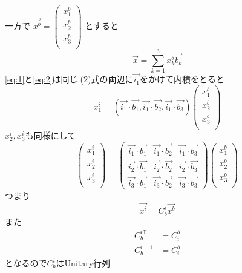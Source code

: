 \documentclass[class=article, crop=false, preview=false, dvipdfmx, a4paper]{standalone}
\begin{document}
一方で
$\vec{x^b}=
    \begin{pmatrix}
    	x^b_1\\
        x^b_2\\
        x^b_3\\
    \end{pmatrix}$
とすると
\begin{equation}
\vec{x} = \sum_{k=1}^{3} x^b_k \vec{b_k}  \label{eq:2}
\end{equation}
\eqref{eq:1}と\eqref{eq:2}は同じ.(2)式の両辺に$\vec{i_1}$をかけて内積をとると
\[ x^i_1 =
	\left(
		\vec{i_1} \cdot \vec{b_1},
        \vec{i_1} \cdot \vec{b_2},
        \vec{i_1} \cdot \vec{b_3}
    \right)
	\begin{pmatrix}
    	x^b_1\\
        x^b_2\\
        x^b_3\\
    \end{pmatrix}
\]
$x^i_2, x^i_3$も同様にして
\[
\begin{pmatrix}
	x^i_1\\
    x^i_2\\
    x^i_3\\
\end{pmatrix}
=
\begin{pmatrix}
	\vec{i_1} \cdot \vec{b_1} & 
    \vec{i_1} \cdot \vec{b_2} & 
    \vec{i_1} \cdot \vec{b_3} \\
    \vec{i_2} \cdot \vec{b_1} &
    \vec{i_2} \cdot \vec{b_2} &
    \vec{i_2} \cdot \vec{b_3} \\
    \vec{i_3} \cdot \vec{b_1} & 
    \vec{i_3} \cdot \vec{b_2} & 
    \vec{i_3} \cdot \vec{b_3}
\end{pmatrix}
\begin{pmatrix}
	x^b_1\\
    x^b_2\\
    x^b_3\\
\end{pmatrix}
\]
つまり
\[ \vec{x^i} = C^i_b\vec{x^b} \]
また
\begin{align}
C_b^{i\mathrm{T}} & = C_i^b \\
C_b^{i-1} & = C^b_i
\end{align}
となるので$C_b^i$はUnitary行列
\end{document}
